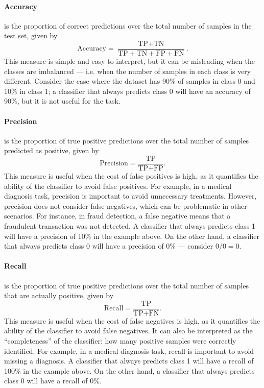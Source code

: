 \paragraph{Accuracy} is the proportion of correct predictions over the total number of
samples in the test set, given by
\begin{equation*}
  \text{Accuracy} = \frac{\text{TP} + \text{TN}}{\text{TP} + \text{TN} + \text{FP} + \text{FN}}\text{.}
\end{equation*}
This measure is simple and easy to interpret, but it can be misleading when the classes
are imbalanced --- i.e. when the number of samples in each class is very different.
Consider the case where the dataset has 90\% of samples in class 0 and 10\% in class 1;
a classifier that always predicts class 0 will have an accuracy of 90\%, but it is not
useful for the task.

\paragraph{Precision} is the proportion of true positive predictions over the total number
of samples predicted as positive, given by
\begin{equation*}
  \text{Precision} = \frac{\text{TP}}{\text{TP} + \text{FP}}\text{.}
\end{equation*}
This measure is useful when the cost of false positives is high, as it quantifies the
ability of the classifier to avoid false positives.  For example, in a medical diagnosis
task, precision is important to avoid unnecessary treatments.  However, precision does not
consider false negatives, which can be problematic in other scenarios.  For instance, in
fraud detection, a false negative means that a fraudulent transaction was not detected.
A classifier that always predicts class 1 will have a precision of 10\% in the example
above.  On the other hand, a classifier that always predicts class 0 will have a precision
of 0\% --- consider $0/0 = 0$.

\paragraph{Recall} is the proportion of true positive predictions over the total number of
samples that are actually positive, given by
\begin{equation*}
  \text{Recall} = \frac{\text{TP}}{\text{TP} + \text{FN}}\text{.}
\end{equation*}
This measure is useful when the cost of false negatives is high, as it quantifies the
ability of the classifier to avoid false negatives.  It can also be interpreted as the
``completeness'' of the classifier: how many positive samples were correctly identified.
For example, in a medical diagnosis task, recall is important to avoid missing a
diagnosis.  A classifier that always predicts class 1 will have a recall of 100\% in the
example above.  On the other hand, a classifier that always predicts class 0 will have a
recall of 0\%.

